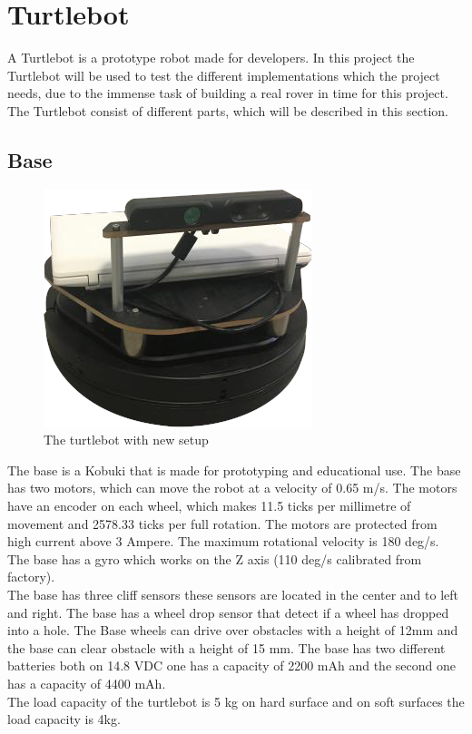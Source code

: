 \section{Turtlebot} %
A Turtlebot is a prototype robot made for developers. In this project the Turtlebot will be used to test the different implementations which the project needs, due to the immense task of building a real rover in time for this project.\\
The Turtlebot consist of different parts, which will be described in this section.

\subsection{Base} %
\begin{figure}[h]
    \centering
    \includegraphics[width=.5\textwidth]{figures/turtlebot001.png}
    \caption{The turtlebot with new setup} 
    \label{fig:turtlebot} 
\end{figure}
The base is a Kobuki that is made for prototyping and educational use. The base has two motors, which can move the robot at a velocity of 0.65 m/s. The motors have an encoder on each wheel, which makes 11.5 ticks per millimetre of movement and 2578.33 ticks per full rotation. The motors are protected from high current above 3 Ampere. The maximum rotational velocity is 180 deg/s. The base has a gyro which works on the Z axis (110 deg/s calibrated from factory).\\
The base has three cliff sensors these sensors are located in the center and to left and right. The base has a wheel drop sensor that detect if a wheel has dropped into a hole. The Base wheels can drive over obstacles with a height of 12mm and the base can clear obstacle with a height of 15 mm. The base has two different batteries both on 14.8 VDC one has a capacity of 2200 mAh and the second one has a capacity of 4400 mAh.\\
The load capacity of the turtlebot is 5 kg on hard surface and on soft surfaces the load capacity is 4kg\cite{Base}.


